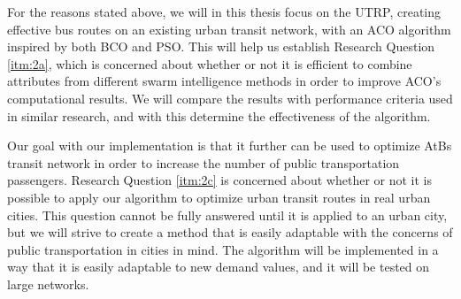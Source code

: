For the reasons stated above, we will in this thesis focus on the UTRP, creating effective bus routes on an existing urban transit network, with an ACO algorithm inspired by both BCO and PSO. This will help us establish Research Question \vref{itm:2a}, which is concerned about whether or not it is efficient to combine attributes from different swarm intelligence methods in order to improve ACO's computational results. We will compare the results with performance criteria used in similar research, and with this determine the effectiveness of the algorithm. 

Our goal with our implementation is that it further can be used to optimize AtBs transit network in order to increase the number of public transportation passengers. Research Question \vref{itm:2c} is concerned about whether or not it is possible to apply our algorithm to optimize urban transit routes in real urban cities. This question cannot be fully answered until it is applied to an urban city, but we will strive to create a method that is easily adaptable with the concerns of public transportation in cities in mind. The algorithm will be implemented in a way that it is easily adaptable to new demand values, and it will be tested on large networks.


